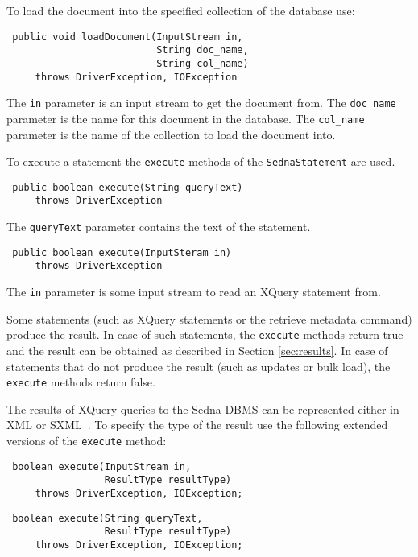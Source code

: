 \documentclass[a4paper,12pt]{article}
\begin{document}
To load the document into the specified collection of the database use:

\begin{verbatim}
 public void loadDocument(InputStream in,
                          String doc_name,
                          String col_name)
     throws DriverException, IOException
\end{verbatim}

The \verb!in! parameter is an input stream to get the document from. The
\verb!doc_name! parameter is the name for this document in the database. The
\verb!col_name! parameter is the name of the collection to load the document
into.

To execute a statement the \verb!execute! methods of the \verb!SednaStatement!
are used.

\begin{verbatim}
 public boolean execute(String queryText)
     throws DriverException
\end{verbatim}

The \verb!queryText! parameter contains the text of the statement.

\begin{verbatim}
 public boolean execute(InputSteram in)
     throws DriverException
\end{verbatim}

The \verb!in! parameter is some input stream to read an XQuery statement from.

Some statements (such as XQuery statements or the retrieve metadata command)
produce the result. In case of such statements, the \verb!execute! methods
return true and the result can be obtained as described in Section
\ref{sec:results}. In case of statements that do not produce the result (such as
updates or bulk load), the \verb!execute! methods return false.

The results of XQuery queries to the Sedna DBMS can be represented either in XML
or SXML~\cite{paper:sxml}. To specify the type of the result use the following
extended versions of the \verb!execute! method:

\begin{verbatim}
 boolean execute(InputStream in,
                 ResultType resultType)
     throws DriverException, IOException;
\end{verbatim}

\begin{verbatim}
 boolean execute(String queryText,
                 ResultType resultType)
     throws DriverException, IOException;
\end{verbatim}
\end{document}
